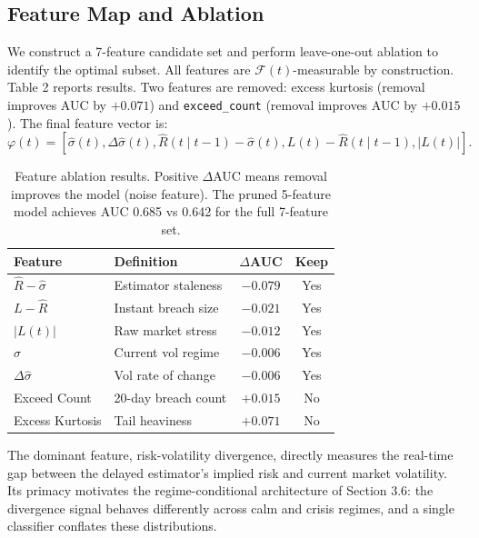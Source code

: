 \documentclass[sigconf]{acmart}
\begin{document}
\subsection{Feature Map and Ablation}
We construct a 7-feature candidate set and perform leave-one-out ablation to identify the optimal subset. All features are $\mathcal{F}(t)$-measurable by construction. Table 2 reports results. Two features are removed: excess kurtosis (removal improves AUC by $+0.071$) and \texttt{exceed\_count} (removal improves AUC by $+0.015$). The final feature vector is:
\begin{equation}
\varphi(t) = [\hat{\sigma}(t), \Delta\hat{\sigma}(t), \hat{R}(t \mid t - 1) - \hat{\sigma}(t), L(t) - \hat{R}(t \mid t - 1), |L(t)|].
\end{equation}

\begin{table}[t]
\caption{Feature ablation results. Positive $\Delta$AUC means removal improves the model (noise feature). The pruned 5-feature model achieves AUC 0.685 vs 0.642 for the full 7-feature set.}
\label{tab:ablation}
\small
\begin{tabular}{llcc}
\toprule
\textbf{Feature} & \textbf{Definition} & $\Delta$\textbf{AUC} & \textbf{Keep} \\
\midrule
$\hat{R} - \hat{\sigma}$ & Estimator staleness & $-0.079$ & Yes \\
$L - \hat{R}$           & Instant breach size & $-0.021$ & Yes \\
$|L(t)|$                & Raw market stress   & $-0.012$ & Yes \\
$\hat{\sigma}$          & Current vol regime  & $-0.006$ & Yes \\
$\Delta\hat{\sigma}$    & Vol rate of change  & $-0.006$ & Yes \\
Exceed Count            & 20-day breach count & $+0.015$ & No \\
Excess Kurtosis         & Tail heaviness      & $+0.071$ & No \\
\bottomrule
\end{tabular}
\end{table}

The dominant feature, risk-volatility divergence, directly measures the real-time gap between the delayed estimator's implied risk and current market volatility. Its primacy motivates the regime-conditional architecture of Section 3.6: the divergence signal behaves differently across calm and crisis regimes, and a single classifier conflates these distributions.
\end{document}
